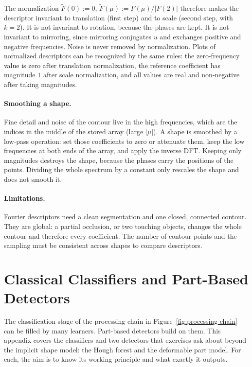 \noindent
The normalization $\tilde F(0) := 0$, $\tilde F(\mu) := F(\mu)/\lvert F(2)\rvert$
therefore makes the descriptor invariant to translation (first step) and to
scale (second step, with $k=2$). It is not invariant to rotation, because the
phases are kept. It is not invariant to mirroring, since mirroring conjugates
$u$ and exchanges positive and negative frequencies. Noise is never removed by
normalization. Plots of normalized descriptors can be recognized by the same
rules: the zero-frequency value is zero after translation normalization, the
reference coefficient has magnitude $1$ after scale normalization, and all
values are real and non-negative after taking magnitudes.

\paragraph{Smoothing a shape.}
Fine detail and noise of the contour live in the high frequencies, which are the
indices in the middle of the stored array (large $\lvert\mu\rvert$). A shape is
smoothed by a low-pass operation: set those coefficients to zero or attenuate
them, keep the low frequencies at both ends of the array, and apply the inverse
DFT. Keeping only magnitudes destroys the shape, because the phases carry the
positions of the points. Dividing the whole spectrum by a constant only rescales
the shape and does not smooth it.

\paragraph{Limitations.}
Fourier descriptors need a clean segmentation and one closed, connected contour.
They are global: a partial occlusion, or two touching objects, changes the whole
contour and therefore every coefficient. The number of contour points and the
sampling must be consistent across shapes to compare descriptors.

\section{Classical Classifiers and Part-Based Detectors}
\label{app:classifiers}

The classification stage of the processing chain in
Figure~\ref{fig:processing-chain} can be filled by many learners. Part-based
detectors build on them. This appendix covers the classifiers and two
detectors that exercises ask about beyond the implicit shape model: the Hough
forest and the deformable part model. For each, the aim is to know its working
principle and what exactly it outputs.

